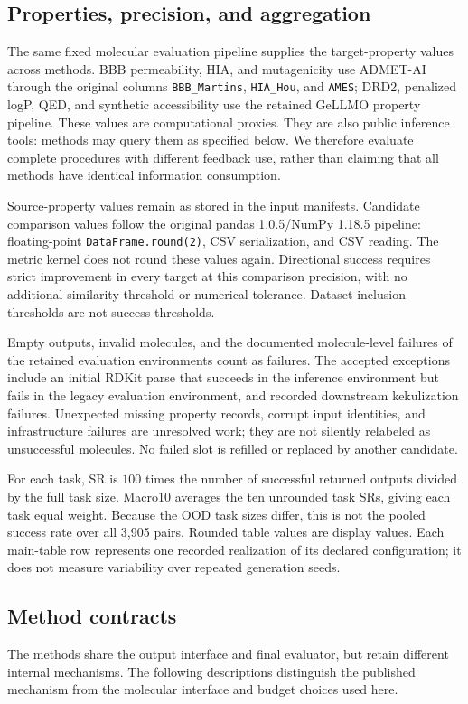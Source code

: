 \subsection{Properties, precision, and aggregation}
The same fixed molecular evaluation pipeline supplies the target-property values across methods. BBB permeability, HIA, and mutagenicity use ADMET-AI \citep{admet2024} through the original columns \texttt{BBB\_Martins}, \texttt{HIA\_Hou}, and \texttt{AMES}; DRD2, penalized logP, QED, and synthetic accessibility use the retained GeLLMO property pipeline. These values are computational proxies. They are also public inference tools: methods may query them as specified below. We therefore evaluate complete procedures with different feedback use, rather than claiming that all methods have identical information consumption.

Source-property values remain as stored in the input manifests. Candidate comparison values follow the original pandas 1.0.5/NumPy 1.18.5 pipeline: floating-point \texttt{DataFrame.round(2)}, CSV serialization, and CSV reading. The metric kernel does not round these values again. Directional success requires strict improvement in every target at this comparison precision, with no additional similarity threshold or numerical tolerance. Dataset inclusion thresholds are not success thresholds.

Empty outputs, invalid molecules, and the documented molecule-level failures of the retained evaluation environments count as failures. The accepted exceptions include an initial RDKit parse that succeeds in the inference environment but fails in the legacy evaluation environment, and recorded downstream kekulization failures. Unexpected missing property records, corrupt input identities, and infrastructure failures are unresolved work; they are not silently relabeled as unsuccessful molecules. No failed slot is refilled or replaced by another candidate.

For each task, SR is $100$ times the number of successful returned outputs divided by the full task size. Macro10 averages the ten unrounded task SRs, giving each task equal weight. Because the OOD task sizes differ, this is not the pooled success rate over all 3,905 pairs. Rounded table values are display values. Each main-table row represents one recorded realization of its declared configuration; it does not measure variability over repeated generation seeds.

\subsection{Method contracts}
The methods share the output interface and final evaluator, but retain different internal mechanisms. The following descriptions distinguish the published mechanism from the molecular interface and budget choices used here.

